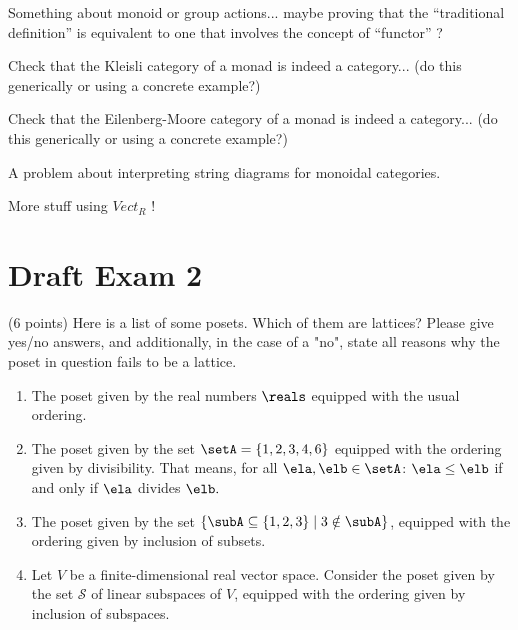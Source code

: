 \documentclass[paper=8.125in:10.250in,pagesize=pdftex,
    headinclude=false,footinclude=false,oneside,egregdoesnotlikesansseriftitles]{kaobook}
\begin{document}
\begin{exercise}
Something about monoid or group actions... maybe proving that the ``traditional definition'' is equivalent to one that involves the concept of ``functor'' ?
\end{exercise}


\begin{exercise}
Check that the Kleisli category of a monad is indeed a category... (do this generically or using a concrete example?)
\end{exercise}

\begin{exercise}
Check that the Eilenberg-Moore category of a monad is indeed a category...  (do this generically or using a concrete example?)
\end{exercise}


\begin{exercise}
A problem about interpreting string diagrams for monoidal categories. 
\end{exercise}


\begin{exercise}
More stuff using $Vect_R$ !
\end{exercise}

\newpage



\section*{Draft Exam 2}

\begin{gradedexercise}\label{ex:LatticeCheck}
(6 points) Here is a list of some posets. Which of them are lattices? 
Please give yes/no answers, and additionally, in the case of a "no", state all reasons why the poset in question fails to be a lattice. 
\begin{enumerate}
\item The poset given by the real numbers $\reals$ equipped with the usual ordering. 
\item The poset given by the set $\setA = \{ 1, 2, 3, 4, 6\}$ equipped with the ordering given by divisibility. That means, for all $\ela, \elb \in \setA$: $\ela \leq \elb$ if and only if $\ela$ divides $\elb.$ 
\item The poset given by the set $\{ \subA \subseteq \{1, 2 , 3 \} \mid 3 \notin \subA \}$, equipped with the ordering given by inclusion of subsets. 
\item Let $V$ be a finite-dimensional real vector space. Consider the poset given by the set $\mathcal{S}$ of linear subspaces of $V$, equipped with the ordering given by inclusion of subspaces. 
\end{enumerate}
\end{gradedexercise}
\end{document}
